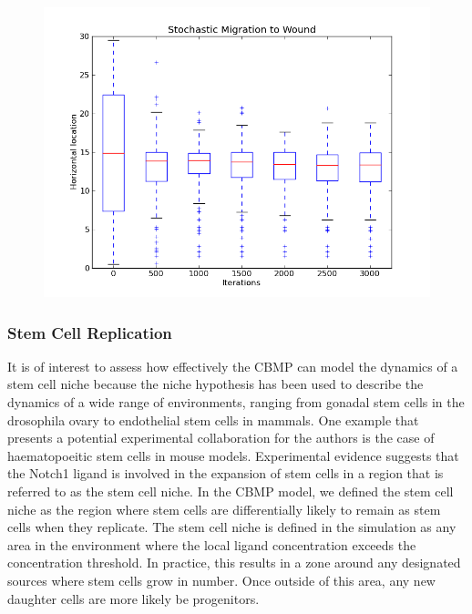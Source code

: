 \documentclass[12pt]{article}
\begin{document}
\begin{figure}[H]
\centering
\includegraphics[width=14.51cm]{media/StochMigrationtoWound.png}
\end{figure}

\subsubsection{Stem Cell Replication}
It is of interest to assess how effectively the CBMP can model the 
dynamics of a stem cell niche because the niche hypothesis has been used 
to describe the dynamics of a wide range of environments, ranging from 
gonadal stem cells in the drosophila ovary to endothelial stem cells in 
mammals.\cite{linheng05} One example that presents a potential experimental 
collaboration for the authors is the case of haematopoeitic stem cells in 
mouse models. Experimental evidence suggests that the Notch1 ligand is 
involved in the expansion of stem cells in a region that is referred to 
as the stem cell niche.\cite{calvi03} In the CBMP model, we defined the stem cell 
niche as the region where stem cells are differentially likely to remain 
as stem cells when they replicate. The stem cell niche is defined in the 
simulation as any area in the environment where the local ligand 
concentration exceeds the concentration threshold. In practice, this 
results in a zone around any designated sources where stem cells grow in 
number. Once outside of this area, any new daughter cells are more 
likely be progenitors. 
\end{document}

